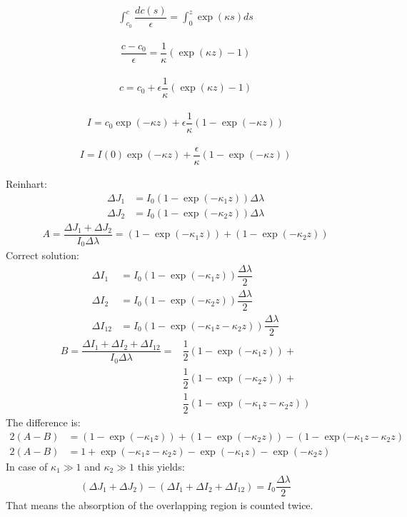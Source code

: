 \begin{align}
	\int_{c_0}^c \dfrac{d c(s)}{\epsilon}  =  \int_0^z \exp(\kappa s) ds
\end{align}

\begin{align}
	\dfrac{c - c_0}{\epsilon}  = \dfrac{1}{\kappa} \left(\exp(\kappa z) - 1\right)
\end{align}

\begin{align}
	c = c_0 + \epsilon \dfrac{1}{\kappa} \left(\exp(\kappa z) - 1\right)
\end{align}

\begin{align}
	I = c_0 \exp( - \kappa z) + \epsilon \dfrac{1}{\kappa} \left(1 - \exp( - \kappa z)\right)
\end{align}

\begin{align}
	I = I(0) \exp( - \kappa z) +  \dfrac{\epsilon}{\kappa} \left(1 - \exp( - \kappa z)\right)
\end{align}


Reinhart:
\begin{align}
	\Delta J_1 &= I_0 \left(1 - \exp( - \kappa_1 z)\right) \Delta \lambda \\
	\Delta J_2 &= I_0 \left(1 - \exp( - \kappa_2 z)\right) \Delta \lambda 
\end{align}
\begin{align}
	A = \dfrac{\Delta J_1 + \Delta J_2}{I_0 \Delta \lambda} = \left(1 - \exp( - \kappa_1 z)\right) + \left(1 - \exp( - \kappa_2 z)\right)
\end{align}
Correct solution:
\begin{align}
	\Delta I_1 &= I_0 \left(1 - \exp( - \kappa_1 z)\right) \dfrac{\Delta \lambda}{2} \\
	\Delta I_2 &= I_0 \left(1 - \exp( - \kappa_2 z)\right) \dfrac{\Delta \lambda}{2} \\
	\Delta I_{12} &= I_0 \left(1 - \exp( - \kappa_1 z - \kappa_2 z)\right) \dfrac{\Delta \lambda}{2}
\end{align}
\begin{align}
	B = \dfrac{\Delta I_1 + \Delta I_2 + \Delta I_{12}}{I_0 \Delta \lambda} =
			& \dfrac{1}{2} \left(1 - \exp( - \kappa_1 z)\right) +  \\
			& \dfrac{1}{2} \left(1 - \exp( - \kappa_2 z)\right) + \\ 
			& \dfrac{1}{2} \left(1 - \exp( - \kappa_1 z - \kappa_2 z)\right) 
\end{align}
The difference is:
\begin{align}
	2(A - B) &= \left(1 - \exp( - \kappa_1 z)\right) + \left(1 - \exp( - \kappa_2 z)\right) -
	\left(1 - \exp( - \kappa_1 z - \kappa_2 z\right) \\
	2(A - B) &= 1  + \exp(- \kappa_1 z - \kappa_2 z) - \exp( - \kappa_1 z) - \exp( - \kappa_2 z)
\end{align}
In case of $\kappa_1 \gg 1$ and $\kappa_2 \gg 1$ this yields: 
\begin{align}
	(\Delta J_1 + \Delta J_2) - (\Delta I_1 + \Delta I_2 + \Delta I_{12})=
	I_0 \dfrac{\Delta \lambda}{2}
\end{align}
That means the absorption of the overlapping region is counted twice.